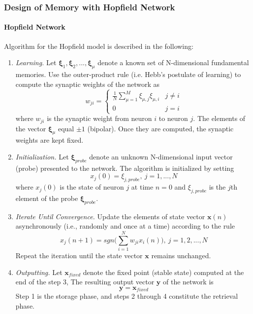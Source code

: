 \documentclass[letterpaper]{article}
\numberwithin{equation}{section}
\begin{document}
\subsubsection{Design of Memory with Hopfield Network}

\paragraph{Hopfield Network}

Algorithm for the Hopfield model is described in the following:

\begin{enumerate}
	\item \textit{Learning.} Let \( \boldsymbol{\xi}_1, \boldsymbol{\xi}_2, ..., \boldsymbol{\xi}_{\mu} \) denote a known set of N-dimensional fundamental memories. Use the outer-product rule (i.e. Hebb's postulate of learning) to compute the synaptic weights of the network as 
	\begin{equation}
		w_{ji} =
			\begin{cases}
				\frac{1}{N} \sum_{\mu=1}^{M}\xi_{\mu,j}\xi_{\mu,i}	& j \neq i \\
				0																										& j = i 
			\end{cases}
	\end{equation}
	where \(w_{ji}\) is the synaptic weight from neuron \(i\) to neuron \(j\). The elements of the vector \( \boldsymbol{\xi}_\mu \) equal \(\pm 1\) (bipolar). Once they are computed, the synaptic weights are kept fixed.
	
	\item \textit{Initialization.} Let \( \boldsymbol{\xi}_{probe} \) denote an unknown N-dimensional input vector (probe) presented to the network. The algorithm is initialized by setting
	\begin{equation}
		x_j(0) = \xi_{j,probe}, \> j = 1,...,N
	\end{equation}
	where \( x_j(0) \) is the state of neuron \(j\) at time \(n = 0\) and \( \xi_{j,probe} \) is the \(j\)th element of the probe \( \boldsymbol{\xi}_{probe} \).
	
	\item \textit{Iterate Until Convergence.} Update the elements of state vector \( \boldsymbol{x}(n) \) asynchronously (i.e., randomly and once at a time) according to the rule
	\begin{equation}
		x_j(n+1)=sgn \Bigg(\sum_{i=1}^{N} w_{ji}x_i(n) \Bigg), \> j = 1,2, ..., N
	\end{equation}
	Repeat the iteration until the state vector \( \boldsymbol{x} \) remains unchanged.
	
	\item \textit{Outputting.} Let \( \boldsymbol{x}_{fixed} \) denote the fixed point (stable state) computed at the end of the step 3, The resulting output vector \( \boldsymbol{y} \) of the network is
	\begin{equation}
		\boldsymbol{y} = \boldsymbol{x}_{fixed}
	\label{eq:}
	\end{equation}
	Step 1 is the storage phase, and steps 2 through 4 constitute the retrieval phase.
\end{enumerate}
\end{document}
